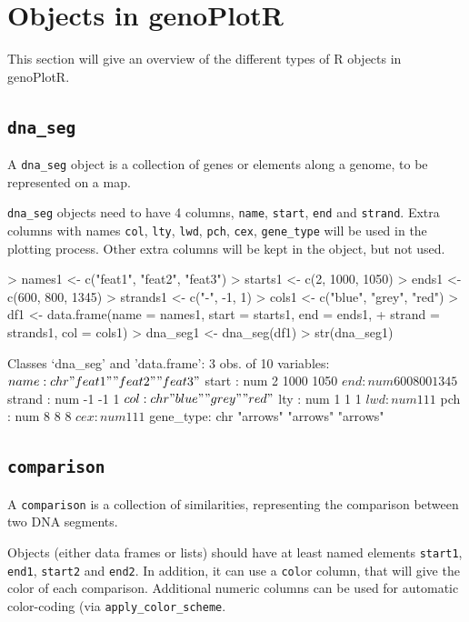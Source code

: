 \documentclass[a4paper]{article}
\newcommand{\code}[1]{\texttt{#1}}
\newcommand{\pkg}[1]{{\normalfont\fontseries{b}\selectfont #1}}
\newcommand{\genoPlotR}{\pkg{genoPlotR}}
\newcommand{\R}{{\sffamily R}}
\begin{document}
\section{Objects in \genoPlotR{}}

This section will give an overview of the different types of \R{} objects in
\genoPlotR{}.

\subsection{\code{dna\_seg}}

A \code{dna\_seg} object is a collection of genes or elements along a 
genome, to be represented on a map. 

\code{dna\_seg} objects need to have 4 columns, \code{name}, \code{start}, 
\code{end} and \code{strand}. Extra columns with names \code{col}, 
\code{lty}, \code{lwd}, \code{pch}, \code{cex}, \code{gene\_type} will 
be used in the  plotting process. Other extra columns will be kept in 
the object, but not used.

\begin{Schunk}
\begin{Sinput}
> names1 <- c("feat1", "feat2", "feat3")
> starts1 <- c(2, 1000, 1050)
> ends1 <- c(600, 800, 1345)
> strands1 <- c("-", -1, 1)
> cols1 <- c("blue", "grey", "red")
> df1 <- data.frame(name = names1, start = starts1, end = ends1, 
+     strand = strands1, col = cols1)
> dna_seg1 <- dna_seg(df1)
> str(dna_seg1)
\end{Sinput}
\begin{Soutput}
Classes ‘dna_seg’ and 'data.frame':	3 obs. of  10 variables:
 $ name     : chr  "feat1" "feat2" "feat3"
 $ start    : num  2 1000 1050
 $ end      : num  600 800 1345
 $ strand   : num  -1 -1 1
 $ col      : chr  "blue" "grey" "red"
 $ lty      : num  1 1 1
 $ lwd      : num  1 1 1
 $ pch      : num  8 8 8
 $ cex      : num  1 1 1
 $ gene_type: chr  "arrows" "arrows" "arrows"
\end{Soutput}
\end{Schunk}

\subsection{\code{comparison}}

A \code{comparison} is a collection of similarities, representing the
comparison between two DNA segments. 

Objects (either data frames or lists) should have at least named
elements \code{start1}, \code{end1}, \code{start2} and \code{end2}. 
In addition, it can use a \code{col}or column, that will give
the color of each comparison. Additional numeric columns can be used 
for automatic color-coding (via \code{apply\_color\_scheme}.
\end{document}
